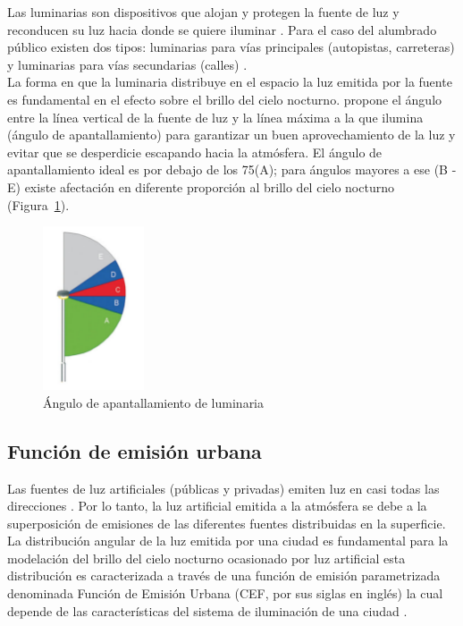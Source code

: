 Las luminarias son dispositivos que alojan y protegen la fuente de luz y reconducen su luz hacia donde se quiere iluminar \citep{LibroCL}. Para el caso del alumbrado público existen dos tipos: luminarias para vías principales (autopistas, carreteras) y luminarias para vías secundarias (calles) \citep{INFO2019}.\\

La forma en que la luminaria distribuye en el espacio la luz emitida por la fuente es fundamental en el efecto sobre el brillo del cielo nocturno. \cite{Marin2009} propone el ángulo entre la línea vertical de la fuente de luz y la línea máxima a la que ilumina (ángulo de apantallamiento) para garantizar un buen aprovechamiento de la luz y evitar que se desperdicie escapando hacia la atmósfera. El ángulo de apantallamiento ideal es por debajo de los 75\grad (A); para ángulos mayores a ese (B - E) existe afectación en diferente proporción al brillo del cielo nocturno (Figura~\ref{anguloapantallamiento}).


\begin{figure}[htb]
  \centering
    \includegraphics[width=30mm, scale=0.3]{anguloapantallamiento}
  \caption{Ángulo de apantallamiento de luminaria \citep{Marin2009}}
  \label{anguloapantallamiento}
\end{figure}


\subsection{Función de emisión urbana}
\label{subsec:funciondemisionurbana}

Las fuentes de luz artificiales (públicas y privadas) emiten luz en casi todas las direcciones \citep{Kocifaj2014,Kocifaj2016}. Por lo tanto, la luz artificial emitida a la atmósfera se debe a la superposición de emisiones de las diferentes fuentes distribuidas en la superficie.\\

La distribución angular de la luz emitida por una ciudad es fundamental para la modelación del brillo del cielo nocturno ocasionado por luz artificial \citep{Kocifaj2014} esta distribución es caracterizada a través de una función de emisión parametrizada denominada Función de Emisión Urbana (CEF, por sus siglas en inglés) la cual depende de las características del sistema de iluminación de una ciudad \citep{Kocifaj2014}.\\

